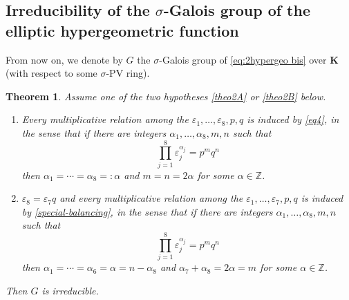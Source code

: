 \documentclass[11pt]{article}
\newcommand{\Subsection}{\subsection}
\numberwithin{equation}{section}\providecommand{\loccit}{\textit{loc.\ cit.}}
\newtheorem{theo}{Theorem}[section]
\theoremstyle{definition}
\newcommand{\Z}{\mathbb Z}
\newcommand\K{\boldsymbol{K}}
\let\s\sigma
\begin{document}
\Subsection{Irreducibility of the $\s$-Galois group of the elliptic hypergeometric function}
From now on, we denote by $G$ the $\s$-Galois group of \eqref{eq:2hypergeo bis} over $\K$ (with respect to some $\s$-PV ring).

\begin{theo}\label{theo2} Assume one of the two hypotheses \eqref{theo2A} or \eqref{theo2B} below.

\begin{enumerate}\renewcommand{\theenumi}{\Alph{enumi}}
\item\label{theo2A}
Every multiplicative relation among the $\varepsilon_{1},\dots,\varepsilon_{8},p,q$ is induced by \eqref{eq4}, in the sense that if there are integers $\alpha_{1},\dots,\alpha_{8},m,n$ such that
\[
\prod_{j=1}^{8}\varepsilon_{j}^{\alpha_{j}} =p^{m}q^{n}
\]
then $\alpha_{1}=\cdots=\alpha_{8}=:\alpha$ and $m=n=2\alpha$ for some $\alpha\in \Z$.

\item\label{theo2B}
$\varepsilon_8=\varepsilon_7q$ and every multiplicative relation among the $\varepsilon_{1},\dots,\varepsilon_{7},p,q$ is induced by \eqref{special-balancing}, in the sense that if there are integers $\alpha_{1},\dots,\alpha_{8},m,n$ such that
\[
\prod_{j=1}^{8}\varepsilon_{j}^{\alpha_{j}} =p^{m}q^{n}
\]
then $\alpha_{1}=\cdots=\alpha_{6}=\alpha=n-\alpha_8$ and $\alpha_7+\alpha_8=2\alpha=m$ for some $\alpha\in \Z$.
\end{enumerate}

Then $G$ is irreducible.
\end{theo}
\end{document}
